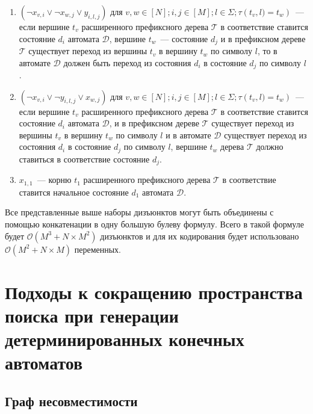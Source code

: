 \begin{enumerate}
  \item $\left(\neg x_{v,i} \vee \neg x_{w,j} \vee y_{i,l,j}\right)$ для $v,w \in \left[N\right]; i,j \in \left[M\right];l \in \Sigma; \tau\left(t_{v},l) = t_{w}\right)$~{---} если вершине $t_{v}$ расширенного префиксного дерева $\mathcal{T} $ в соответствие ставится состояние $d_{i}$ автомата $\mathcal{D}$, вершине $t_{w}$~{---} состояние $d_{j}$ и в префиксном дереве $\mathcal{T}$ существует переход из вершины $t_{v}$ в вершину $t_{w}$ по символу $l$, то в автомате $\mathcal{D}$ должен быть переход из состояния $d_{i}$ в состояние $d_{j}$ по символу $l$.
  \item $\left(\neg x_{v,i} \vee \neg y_{i,l,j} \vee x_{w,j}\right)$ для $v,w \in \left[N\right]; i,j \in \left[M\right];l \in \Sigma; \tau\left(t_{v},l) = t_{w}\right)$~{---} если вершине $t_{v}$ расширенного префиксного дерева $\mathcal{T} $ в соответствие ставится состояние $d_{i}$ автомата $\mathcal{D}$, и в префиксном дереве $\mathcal{T}$ существует переход из вершины $t_{v}$ в вершину $t_{w}$ по символу $l$ и в автомате $\mathcal{D}$ существует переход из состояния $d_{i}$ в состояние $d_{j}$ по символу $l$, вершине $t_{w}$ дерева $\mathcal{T}$ должно ставиться в соответствие состояние $d_{j}$.
  \item $x_{1,1}$~{---} корню $t_{1}$ расширенного префиксного дерева $\mathcal{T} $ в соответствие ставится начальное состояние $d_{1}$ автомата $\mathcal{D}$.
\end{enumerate}

Все представленные выше наборы дизъюнктов могут быть объединены с помощью конкатенации в одну большую булеву формулу. Всего в такой формуле будет $\mathcal{O}(M^{3} + N \times M^{2})$ дизъюнктов и для их кодирования будет использовано $\mathcal{O}(M^2 + N \times M)$ переменных.


\section{Подходы к сокращению пространства поиска при генерации детерминированных конечных автоматов}
\label{sec:review:sym-breaking}


\subsection{Граф несовместимости}
\label{sec:review:sym-breaking:ig}

